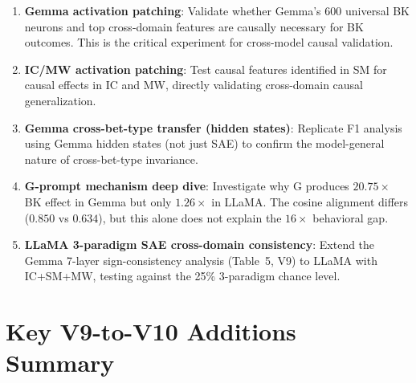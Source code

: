 \documentclass[11pt,a4paper]{article}
\begin{document}
\begin{enumerate}[nosep]
    \item \textbf{Gemma activation patching}: Validate whether Gemma's 600 universal BK neurons and top cross-domain features are causally necessary for BK outcomes. This is the critical experiment for cross-model causal validation.
    \item \textbf{IC/MW activation patching}: Test causal features identified in SM for causal effects in IC and MW, directly validating cross-domain causal generalization.
    \item \textbf{Gemma cross-bet-type transfer (hidden states)}: Replicate F1 analysis using Gemma hidden states (not just SAE) to confirm the model-general nature of cross-bet-type invariance.
    \item \textbf{G-prompt mechanism deep dive}: Investigate why G produces $20.75\times$ BK effect in Gemma but only $1.26\times$ in LLaMA. The cosine alignment differs ($0.850$ vs $0.634$), but this alone does not explain the $16\times$ behavioral gap.
    \item \textbf{LLaMA 3-paradigm SAE cross-domain consistency}: Extend the Gemma 7-layer sign-consistency analysis (Table~5, V9) to LLaMA with IC+SM+MW, testing against the 25\% 3-paradigm chance level.
\end{enumerate}

\appendix
\section{Key V9-to-V10 Additions Summary}
\end{document}
